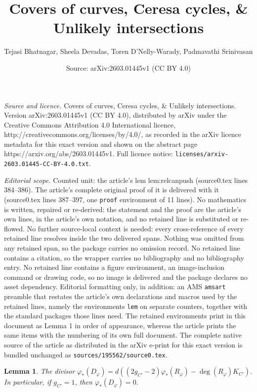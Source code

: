 \documentclass[10pt,a4paper]{amsart}
\title{Covers of curves, Ceresa cycles, \& Unlikely intersections}
\author{Tejasi Bhatnagar, Sheela Devadas, Toren D'Nelly-Warady, Padmavathi Srinivasan}
\date{Source: arXiv:2603.01445v1 (CC BY 4.0)}
\newtheorem{lem}{Lemma}
\begin{document}
\maketitle

\noindent\emph{Source and licence.} Covers of curves, Ceresa cycles, \& Unlikely intersections. Version arXiv:2603.01445v1 (CC BY 4.0), distributed by arXiv under the Creative Commons Attribution 4.0 International licence, http://creativecommons.org/licenses/by/4.0/, as recorded in the arXiv licence metadata for this exact version and shown on the abstract page https://arxiv.org/abs/2603.01445v1. Full licence notice: \texttt{licenses/arxiv-2603.01445-CC-BY-4.0.txt}.\par\smallskip

\noindent\textit{Editorial scope.} Counted unit: the article's lem lem:relcanpush (source0.tex lines 384--386). The article's complete original proof of it is delivered with it (source0.tex lines 387--397, one \texttt{proof} environment of 11 lines). No mathematics is written, repaired or re-derived: the statement and the proof are the article's own lines, in the article's own notation, and no retained line is substituted or re-flowed.  No further source-local context is needed: every cross-reference of every retained line resolves inside the two delivered spans.  Nothing was omitted from any retained span, so the package carries no omission record.  No retained line contains a citation, so the wrapper carries no bibliography and no bibliography entry.  No retained line contains a figure environment, an image-inclusion command or drawing code, so no image is delivered and the package declares no asset dependency.  Editorial formatting only, in addition: an AMS \texttt{amsart} preamble that restates the article's own declarations and macros used by the retained lines, namely the environments \texttt{lem} on separate counters, together with the standard packages those lines need.  The retained environments print in this document as Lemma 1 in order of appearance, whereas the article prints the same items with the numbering of its own full document.  The complete native source of the article as distributed in the arXiv e-print for this exact version is bundled unchanged as \texttt{sources/195562/source0.tex}.
 \begin{lem}\label{lem:relcanpush}
The divisor $\varphi_*(D_{\varphi}) = d ((2g_{C'}-2) \varphi_*(R_{\varphi})-\deg(R_{\varphi}) K_{C'}).$ In particular, if $g_{C'} = 1$, then  $\varphi_*(D_{\varphi}) = 0$.
\end{lem}
\end{document}
